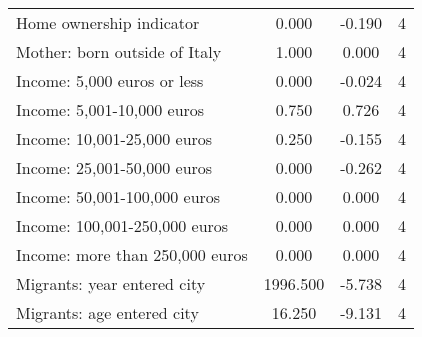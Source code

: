 \begin{table}[htbp]
\begin{tabular}{l*{1}{ccc}}
Home ownership indicator&       0.000         &      -0.190&           4\\
Mother: born outside of Italy&       1.000         &       0.000&           4\\
Income: 5,000 euros or less&       0.000         &      -0.024&           4\\
Income: 5,001-10,000 euros&       0.750\sym{***}&       0.726&           4\\
Income: 10,001-25,000 euros&       0.250         &      -0.155&           4\\
Income: 25,001-50,000 euros&       0.000         &      -0.262&           4\\
Income: 50,001-100,000 euros&       0.000         &       0.000&           4\\
Income: 100,001-250,000 euros&       0.000         &       0.000&           4\\
Income: more than 250,000 euros&       0.000         &       0.000&           4\\
Migrants: year entered city&    1996.500\sym{***}&      -5.738&           4\\
Migrants: age entered city&      16.250\sym{**} &      -9.131&           4\\
\bottomrule
\end{tabular}
\end{table}
